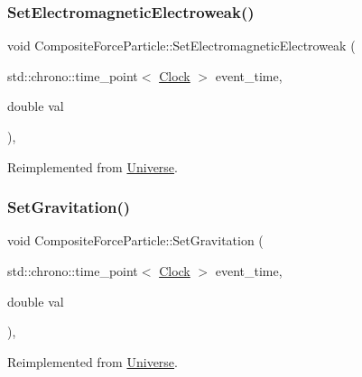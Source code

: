 \subsubsection{\texorpdfstring{Set\+Electromagnetic\+Electroweak()}{SetElectromagneticElectroweak()}}
{\footnotesize\ttfamily void Composite\+Force\+Particle\+::\+Set\+Electromagnetic\+Electroweak (\begin{DoxyParamCaption}\item[{std\+::chrono\+::time\+\_\+point$<$ \mbox{\hyperlink{universe_8h_a0ef8d951d1ca5ab3cfaf7ab4c7a6fd80}{Clock}} $>$}]{event\+\_\+time,  }\item[{double}]{val }\end{DoxyParamCaption})\hspace{0.3cm}{\ttfamily [inline]}, {\ttfamily [virtual]}}



Reimplemented from \mbox{\hyperlink{classUniverse_a608aa95698380f791a0ffba45cc1bee3}{Universe}}.

\mbox{\label{classCompositeForceParticle_ad9e1553ab0096230edd591e3135b223d}} 
\subsubsection{\texorpdfstring{Set\+Gravitation()}{SetGravitation()}}
{\footnotesize\ttfamily void Composite\+Force\+Particle\+::\+Set\+Gravitation (\begin{DoxyParamCaption}\item[{std\+::chrono\+::time\+\_\+point$<$ \mbox{\hyperlink{universe_8h_a0ef8d951d1ca5ab3cfaf7ab4c7a6fd80}{Clock}} $>$}]{event\+\_\+time,  }\item[{double}]{val }\end{DoxyParamCaption})\hspace{0.3cm}{\ttfamily [inline]}, {\ttfamily [virtual]}}



Reimplemented from \mbox{\hyperlink{classUniverse_ae0cb8d86b2fbb8396d605160344b42f5}{Universe}}.

\mbox{\label{classCompositeForceParticle_a06488ef0457335648b161d3ed746b643}} 
